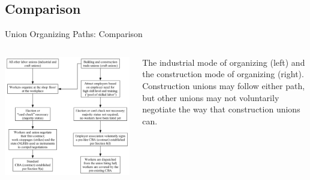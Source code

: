 \documentclass{beamer}
\begin{document}
\subsection{Comparison}
\begin{frame}{Union Organizing Paths: Comparison}
  \begin{columns}
    \includegraphics[width=0.9\linewidth]{../images/organizing_paths}

    The industrial mode of organizing (left) and the construction mode of organizing (right).\newline\newline
    Construction unions may follow either path, but other unions may not voluntarily negotiate the way that construction unions can.
    \end{columns}
\end{frame}

%
\end{document}
